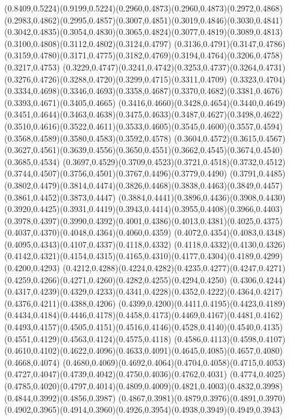 \PST@Solid(0.8409,0.5224)(0.9199,0.5224)\PST@Solid(0.2960,0.4873)(0.2960,0.4873)(0.2972,0.4868)(0.2983,0.4862)(0.2995,0.4857)(0.3007,0.4851)(0.3019,0.4846)(0.3030,0.4841)
(0.3042,0.4835)(0.3054,0.4830)(0.3065,0.4824)(0.3077,0.4819)(0.3089,0.4813)(0.3100,0.4808)(0.3112,0.4802)(0.3124,0.4797)
(0.3136,0.4791)(0.3147,0.4786)(0.3159,0.4780)(0.3171,0.4775)(0.3182,0.4769)(0.3194,0.4764)(0.3206,0.4758)(0.3217,0.4753)
(0.3229,0.4747)(0.3241,0.4742)(0.3253,0.4737)(0.3264,0.4731)(0.3276,0.4726)(0.3288,0.4720)(0.3299,0.4715)(0.3311,0.4709)
(0.3323,0.4704)(0.3334,0.4698)(0.3346,0.4693)(0.3358,0.4687)(0.3370,0.4682)(0.3381,0.4676)(0.3393,0.4671)(0.3405,0.4665)
(0.3416,0.4660)(0.3428,0.4654)(0.3440,0.4649)(0.3451,0.4644)(0.3463,0.4638)(0.3475,0.4633)(0.3487,0.4627)(0.3498,0.4622)
(0.3510,0.4616)(0.3522,0.4611)(0.3533,0.4605)(0.3545,0.4600)(0.3557,0.4594)(0.3568,0.4589)(0.3580,0.4583)(0.3592,0.4578)
(0.3604,0.4572)(0.3615,0.4567)(0.3627,0.4561)(0.3639,0.4556)(0.3650,0.4551)(0.3662,0.4545)(0.3674,0.4540)(0.3685,0.4534)
(0.3697,0.4529)(0.3709,0.4523)(0.3721,0.4518)(0.3732,0.4512)(0.3744,0.4507)(0.3756,0.4501)(0.3767,0.4496)(0.3779,0.4490)
(0.3791,0.4485)(0.3802,0.4479)(0.3814,0.4474)(0.3826,0.4468)(0.3838,0.4463)(0.3849,0.4457)(0.3861,0.4452)(0.3873,0.4447)
(0.3884,0.4441)(0.3896,0.4436)(0.3908,0.4430)(0.3920,0.4425)(0.3931,0.4419)(0.3943,0.4414)(0.3955,0.4408)(0.3966,0.4403)
(0.3978,0.4397)(0.3990,0.4392)(0.4001,0.4386)(0.4013,0.4381)(0.4025,0.4375)(0.4037,0.4370)(0.4048,0.4364)(0.4060,0.4359)
(0.4072,0.4354)(0.4083,0.4348)(0.4095,0.4343)(0.4107,0.4337)(0.4118,0.4332)
\PST@Solid(0.4118,0.4332)(0.4130,0.4326)(0.4142,0.4321)(0.4154,0.4315)(0.4165,0.4310)(0.4177,0.4304)(0.4189,0.4299)(0.4200,0.4293)
(0.4212,0.4288)(0.4224,0.4282)(0.4235,0.4277)(0.4247,0.4271)(0.4259,0.4266)(0.4271,0.4260)(0.4282,0.4255)(0.4294,0.4250)
(0.4306,0.4244)(0.4317,0.4239)(0.4329,0.4233)(0.4341,0.4228)(0.4352,0.4222)(0.4364,0.4217)(0.4376,0.4211)(0.4388,0.4206)
(0.4399,0.4200)(0.4411,0.4195)(0.4423,0.4189)(0.4434,0.4184)(0.4446,0.4178)(0.4458,0.4173)(0.4469,0.4167)(0.4481,0.4162)
(0.4493,0.4157)(0.4505,0.4151)(0.4516,0.4146)(0.4528,0.4140)(0.4540,0.4135)(0.4551,0.4129)(0.4563,0.4124)(0.4575,0.4118)
(0.4586,0.4113)(0.4598,0.4107)(0.4610,0.4102)(0.4622,0.4096)(0.4633,0.4091)(0.4645,0.4085)(0.4657,0.4080)(0.4668,0.4074)
(0.4680,0.4069)(0.4692,0.4064)(0.4704,0.4058)(0.4715,0.4053)(0.4727,0.4047)(0.4739,0.4042)(0.4750,0.4036)(0.4762,0.4031)
(0.4774,0.4025)(0.4785,0.4020)(0.4797,0.4014)(0.4809,0.4009)(0.4821,0.4003)(0.4832,0.3998)(0.4844,0.3992)(0.4856,0.3987)
(0.4867,0.3981)(0.4879,0.3976)(0.4891,0.3970)(0.4902,0.3965)(0.4914,0.3960)(0.4926,0.3954)(0.4938,0.3949)(0.4949,0.3943)
